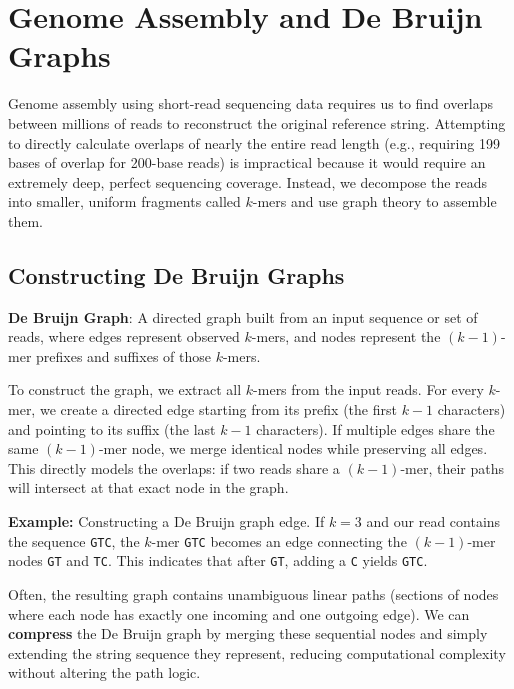 \documentclass[11pt, a4paper]{article}
\newenvironment{important}{%
    \begin{tcolorbox}[colback=blue!5!white,colframe=blue!75!black,title=Important Concept]
}{%
    \end{tcolorbox}
}
\begin{document}

\section{Genome Assembly and De Bruijn Graphs}
Genome assembly using short-read sequencing data requires us to find overlaps between millions of reads to reconstruct the original reference string. Attempting to directly calculate overlaps of nearly the entire read length (e.g., requiring 199 bases of overlap for 200-base reads) is impractical because it would require an extremely deep, perfect sequencing coverage. Instead, we decompose the reads into smaller, uniform fragments called $k$-mers and use graph theory to assemble them.

\subsection{Constructing De Bruijn Graphs}
\begin{important}
    \textbf{De Bruijn Graph}: A directed graph built from an input sequence or set of reads, where edges represent observed $k$-mers, and nodes represent the $(k-1)$-mer prefixes and suffixes of those $k$-mers.
\end{important}

To construct the graph, we extract all $k$-mers from the input reads. For every $k$-mer, we create a directed edge starting from its prefix (the first $k-1$ characters) and pointing to its suffix (the last $k-1$ characters). 
If multiple edges share the same $(k-1)$-mer node, we merge identical nodes while preserving all edges. This directly models the overlaps: if two reads share a $(k-1)$-mer, their paths will intersect at that exact node in the graph. 

\textbf{Example:} Constructing a De Bruijn graph edge.
If $k=3$ and our read contains the sequence \texttt{GTC}, the $k$-mer \texttt{GTC} becomes an edge connecting the $(k-1)$-mer nodes \texttt{GT} and \texttt{TC}. This indicates that after \texttt{GT}, adding a \texttt{C} yields \texttt{GTC}.

Often, the resulting graph contains unambiguous linear paths (sections of nodes where each node has exactly one incoming and one outgoing edge). We can \textbf{compress} the De Bruijn graph by merging these sequential nodes and simply extending the string sequence they represent, reducing computational complexity without altering the path logic.
\end{document}
